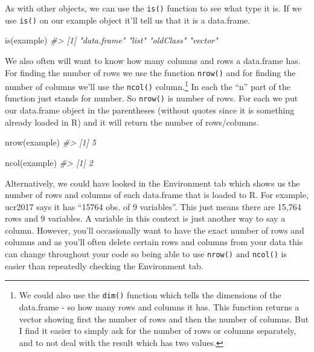 \documentclass[
]{krantz}
\makeatletter
\newenvironment{Shaded}{\begin{snugshade}}{\end{snugshade}}
\newcommand{\CommentTok}[1]{\textcolor[rgb]{0.37,0.37,0.37}{\textit{#1}}}
\newcommand{\FunctionTok}[1]{\textcolor[rgb]{0,0,0}{#1}}
\newcommand{\NormalTok}[1]{#1}
\newenvironment{kframe}{%
\medskip{}
\setlength{\fboxsep}{.8em}
 \def\at@end@of@kframe{}%
 \ifinner\ifhmode%
  \def\at@end@of@kframe{\end{minipage}}%
  \begin{minipage}{\columnwidth}%
 \fi\fi%
 \def\FrameCommand##1{\hskip\@totalleftmargin \hskip-\fboxsep
 \colorbox{shadecolor}{##1}\hskip-\fboxsep
     \hskip-\linewidth \hskip-\@totalleftmargin \hskip\columnwidth}%
 \MakeFramed {\advance\hsize-\width
   \@totalleftmargin\z@ \linewidth\hsize
   \@setminipage}}%
 {\par\unskip\endMakeFramed%
 \at@end@of@kframe}
\renewenvironment{Shaded}{\begin{kframe}}{\end{kframe}}
\makeatother
\begin{document}
As with other objects, we can use the \texttt{is()} function to see what type it is. If we use \texttt{is()} on our example object it'll tell us that it is a data.frame.

\begin{Shaded}
\begin{Highlighting}[]
\FunctionTok{is}\NormalTok{(example)}
\CommentTok{\#\textgreater{} [1] "data.frame" "list"       "oldClass"   "vector"}
\end{Highlighting}
\end{Shaded}

We also often will want to know how many columns and rows a data.frame has. For finding the number of rows we use the function \texttt{nrow()} and for finding the number of columns we'll use the \texttt{ncol()} column.\footnote{We could also use the \texttt{dim()} function which tells the dimensions of the data.frame - so how many rows and columns it has. This function returns a vector showing first the number of rows and then the number of columns. But I find it easier to simply ask for the number of rows or columns separately, and to not deal with the result which has two values.} In each the ``n'' part of the function just stands for number. So \texttt{nrow()} is number of rows. For each we put our data.frame object in the parentheses (without quotes since it is something already loaded in R) and it will return the number of rows/columns.

\begin{Shaded}
\begin{Highlighting}[]
\FunctionTok{nrow}\NormalTok{(example)}
\CommentTok{\#\textgreater{} [1] 5}
\end{Highlighting}
\end{Shaded}

\begin{Shaded}
\begin{Highlighting}[]
\FunctionTok{ncol}\NormalTok{(example)}
\CommentTok{\#\textgreater{} [1] 2}
\end{Highlighting}
\end{Shaded}

Alternatively, we could have looked in the Environment tab which shows us the number of rows and columns of each data.frame that is loaded to R. For example, ucr2017 says it has ``15764 obs. of 9 variables''. This just means there are 15,764 rows and 9 variables. A variable in this context is just another way to say a column. However, you'll occasionally want to have the exact number of rows and columns and as you'll often delete certain rows and columns from your data this can change throughout your code so being able to use \texttt{nrow()} and \texttt{ncol()} is easier than repeatedly checking the Environment tab.
\end{document}
